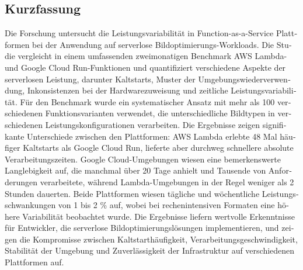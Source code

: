 \documentclass[a4paper, 11pt]{article}
\begin{document}
\clearpage
\begin{otherlanguage}{ngerman}
\section*{Kurzfassung}
Die Forschung untersucht die Leistungsvariabilität in Function-as-a-Service Plattformen bei der Anwendung auf serverlose Bildoptimierungs-Workloads. Die Studie vergleicht in einem umfassenden zweimonatigen Benchmark AWS Lambda- und Google Cloud Run-Funktionen und quantifiziert verschiedene Aspekte der serverlosen Leistung, darunter Kaltstarts, Muster der Umgebungswiederverwendung, Inkonsistenzen bei der Hardwarezuweisung und zeitliche Leistungsvariabilität. Für den Benchmark wurde ein systematischer Ansatz mit mehr als 100 verschiedenen Funktionsvarianten verwendet, die unterschiedliche Bildtypen in verschiedenen Leistungskonfigurationen verarbeiten. Die Ergebnisse zeigen signifikante Unterschiede zwischen den Plattformen: AWS Lambda erlebte 48 Mal häufiger Kaltstarts als Google Cloud Run, lieferte aber durchweg schnellere absolute Verarbeitungszeiten. Google Cloud-Umgebungen wiesen eine bemerkenswerte Langlebigkeit auf, die manchmal über 20 Tage anhielt und Tausende von Anforderungen verarbeitete, während Lambda-Umgebungen in der Regel weniger als 2 Stunden dauerten. Beide Plattformen wiesen tägliche und wöchentliche Leistungsschwankungen von 1 bis 2 \% auf, wobei bei rechenintensiven Formaten eine höhere Variabilität beobachtet wurde. Die Ergebnisse liefern wertvolle Erkenntnisse für Entwickler, die serverlose Bildoptimierungslösungen implementieren, und zeigen die Kompromisse zwischen Kaltstarthäufigkeit, Verarbeitungsgeschwindigkeit, Stabilität der Umgebung und Zuverlässigkeit der Infrastruktur auf verschiedenen Plattformen auf.
\end{otherlanguage}

\clearpage

\enlargethispage{2\baselineskip}
\tableofcontents


\clearpage

\clearpage

\clearpage

\clearpage

\clearpage



\newpage
\emergencystretch=0.3pt %
\printbibliography
\end{document}
